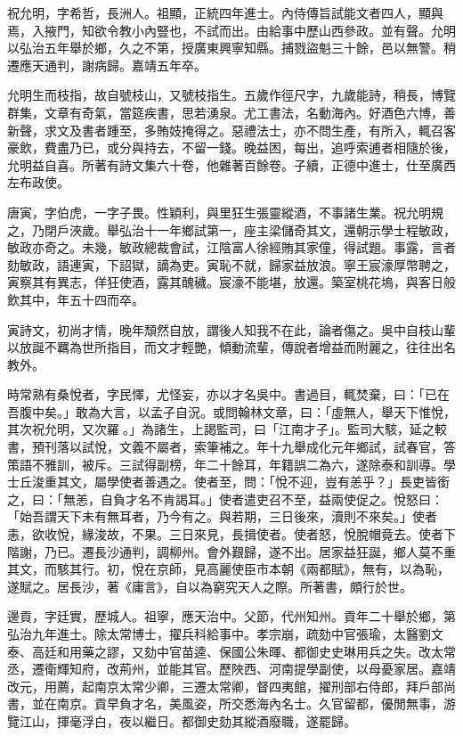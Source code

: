 \begin{pinyinscope}
祝允明，字希哲，長洲人。祖顯，正統四年進士。內侍傳旨試能文者四人，顯與焉，入掖門，知欲令教小內豎也，不試而出。由給事中歷山西參政。並有聲。允明以弘治五年舉於鄉，久之不第，授廣東興寧知縣。捕戮盜魁三十餘，邑以無警。稍遷應天通判，謝病歸。嘉靖五年卒。

允明生而枝指，故自號枝山，又號枝指生。五歲作徑尺字，九歲能詩，稍長，博覽群集，文章有奇氣，當筵疾書，思若湧泉。尤工書法，名動海內。好酒色六博，善新聲，求文及書者踵至，多賄妓掩得之。惡禮法士，亦不問生產，有所入，輒召客豪飲，費盡乃已，或分與持去，不留一錢。晚益困，每出，追呼索逋者相隨於後，允明益自喜。所著有詩文集六十卷，他雜著百餘卷。子續，正德中進士，仕至廣西左布政使。

唐寅，字伯虎，一字子畏。性穎利，與里狂生張靈縱酒，不事諸生業。祝允明規之，乃閉戶浹歲。舉弘治十一年鄉試第一，座主梁儲奇其文，還朝示學士程敏政，敏政亦奇之。未幾，敏政總裁會試，江陰富人徐經賄其家僮，得試題。事露，言者劾敏政，語連寅，下詔獄，謫為吏。寅恥不就，歸家益放浪。寧王宸濠厚幣聘之，寅察其有異志，佯狂使酒，露其醜穢。宸濠不能堪，放還。築室桃花塢，與客日般飲其中，年五十四而卒。

寅詩文，初尚才情，晚年頹然自放，謂後人知我不在此，論者傷之。吳中自枝山輩以放誕不羈為世所指目，而文才輕艷，傾動流輩，傳說者增益而附麗之，往往出名教外。

時常熟有桑悅者，字民懌，尤怪妄，亦以才名吳中。書過目，輒焚棄，曰：「已在吾腹中矣。」敢為大言，以孟子自況。或問翰林文章，曰：「虛無人，舉天下惟悅，其次祝允明，又次羅。」為諸生，上謁監司，曰「江南才子」。監司大駭，延之較書，預刊落以試悅，文義不屬者，索筆補之。年十九舉成化元年鄉試，試春官，答策語不雅訓，被斥。三試得副榜，年二十餘耳，年籍誤二為六，遂除泰和訓導。學士丘浚重其文，屬學使者善遇之。使者至，問：「悅不迎，豈有恙乎？」長吏皆銜之，曰：「無恙，自負才名不肯謁耳。」使者遣吏召不至，益兩使促之。悅怒曰：「始吾謂天下未有無耳者，乃今有之。與若期，三日後來，瀆則不來矣。」使者恚，欲收悅，緣浚故，不果。三日來見，長揖使者。使者怒，悅脫帽竟去。使者下階謝，乃已。遷長沙通判，調柳州。會外艱歸，遂不出。居家益狂誕，鄉人莫不重其文，而駭其行。初，悅在京師，見高麗使臣市本朝《兩都賦》，無有，以為恥，遂賦之。居長沙，著《庸言》，自以為窮究天人之際。所著書，頗行於世。

邊貢，字廷實，歷城人。祖寧，應天治中。父節，代州知州。貢年二十舉於鄉，第弘治九年進士。除太常博士，擢兵科給事中。孝宗崩，疏劾中官張瑜，太醫劉文泰、高廷和用藥之謬，又劾中官苗逵、保國公朱暉、都御史史琳用兵之失。改太常丞，遷衛輝知府，改荊州，並能其官。歷陜西、河南提學副使，以母憂家居。嘉靖改元，用薦，起南京太常少卿，三遷太常卿，督四夷館，擢刑部右侍郎，拜戶部尚書，並在南京。貢早負才名，美風姿，所交悉海內名士。久官留都，優閒無事，游覽江山，揮毫浮白，夜以繼日。都御史劾其縱酒廢職，遂罷歸。


\end{pinyinscope}
